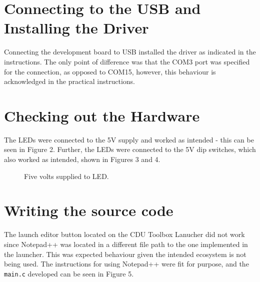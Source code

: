 \documentclass[a4paper]{article}
\begin{document}
\section{Connecting to the USB and Installing the Driver}
Connecting the development board to USB installed the driver as indicated in the instructions. The only point of difference was that the COM3 port was specified for the connection, as opposed to COM15, however, this behaviour is acknowledged in the practical instructions.

\section{Checking out the Hardware}
The LEDs were connected to the 5$\si{\volt}$ supply and worked as intended - this can be seen in Figure 2. Further, the LEDs were connected to the 5$\si{\volt}$ dip switches, which also worked as intended, shown in Figures 3 and 4.

\begin{figure}[h]
	\centering
	\caption{Five volts supplied to LED.}
\end{figure}

\section{Writing the source code}
The launch editor button located on the CDU Toolbox Lanucher did not work since Notepad++ was located in a different file path to the one implemented in the launcher. This was expected behaviour given the intended ecosystem is not being used. The instructions for using Notepad++ were fit for purpose, and the \verb|main.c| developed can be seen in Figure 5.
\end{document}
